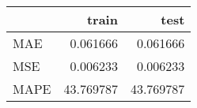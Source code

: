 \begin{tabular}{lrr}
\toprule
{} &      train &       test \\
\midrule
MAE  &   0.061666 &   0.061666 \\
MSE  &   0.006233 &   0.006233 \\
MAPE &  43.769787 &  43.769787 \\
\bottomrule
\end{tabular}
